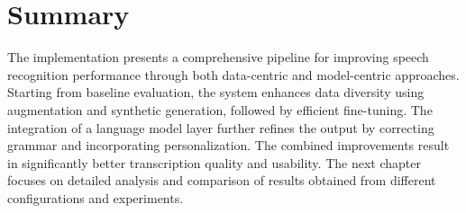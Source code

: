 \section{Summary}
The implementation presents a comprehensive pipeline for improving speech recognition performance through both data-centric and model-centric approaches. Starting from baseline evaluation, the system enhances data diversity using augmentation and synthetic generation, followed by efficient fine-tuning. The integration of a language model layer further refines the output by correcting grammar and incorporating personalization. The combined improvements result in significantly better transcription quality and usability. The next chapter focuses on detailed analysis and comparison of results obtained from different configurations and experiments.